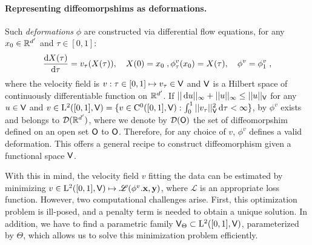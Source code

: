 \paragraph{Representing diffeomorpshims as deformations.}
Such \textit{deformations} $\phi$ are constructed via differential flow equations, for any $x_0\in \mathbb{R}^{d'} $ and $\tau\in[0,1]$:
\begin{equation}
  \label{eq:LDDMM_dynamic}
    \frac{\mathop{}\!\mathrm{d} X(\tau)}{\mathop{}\!\mathrm{d} \tau}= v_\tau(X(\tau)), \quad X(0)=x_0\; ,
    \phi^v_\tau(x_0)=X(\tau), \quad \phi^v=\phi^v_1  \; ,
\end{equation}
where the velocity field is $v:\tau\in [0,1]\mapsto v_\tau\in \mathsf{V} $
and $\mathsf{V}$ is a Hilbert space of continuously differentiable function
on $\mathbb{R}^{d'}$.  If
$||\mathop{}\!\mathrm{d} u ||_{\infty}+|| u ||_{\infty}\leq ||u ||_{\mathsf{V}} $ for any
$u\in \mathsf{V}$ and
$v\in \mathrm{L}^2([0,1],\mathsf{V})=\{v\in \mathrm{C}^0([0,1],\mathsf{V}): \int_0^1 ||
v_\tau||^2_{\mathsf{V}} \mathop{}\!\mathrm{d} \tau<\infty \} $, by \citep[Theorem 5]{glaunes2005transport}
$\phi^v$ exists and belongs to $\mathcal{D}(\mathbb{R}^{d'})$, where we denote by $\mathcal{D}(\mathsf{O}) $ the set of diffeomorpshim defined on an open set $\mathsf{O}$ to $\mathsf{O}$.
 Therefore, for any choice of $v$, $\phi^v$ defines a valid deformation. 
This offers a general recipe to construct diffeomorphism given a functional space $\mathsf{V}$.

With this in mind, the velocity field $v$ fitting the data can be
estimated by minimizing 
$v \in \mathrm{L}^2([0,1],\mathsf{V}) \mapsto \mathscr{L}(\phi^{v}.\mathbf{x},\mathbf{y})$, where $\mathscr{L}$ is an appropriate loss function.
 However, two computational challenges arise.
  First, this optimization problem is ill-posed, and a penalty term is needed to obtain a unique solution.
   In addition, we have to find a parametric family $\mathsf{V}_{\Theta} \subset \mathrm{L}^2([0,1],\mathsf{V})$, parameterized by $\Theta$, which allows us to solve this minimization problem efficiently. 

